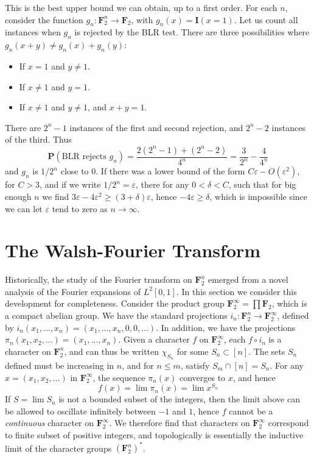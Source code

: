 This is the best upper bound we can obtain, up to a first order. For each $n$, consider the function $g_n: \mathbf{F}_2^n \to \mathbf{F}_2$, with $g_n(x) = \mathbf{I}(x = 1)$. Let us count all instances when $g_n$ is rejected by the BLR test. There are three possibilities where $g_n(x + y) \neq g_n(x) + g_n(y)$:
%
\begin{itemize}
    \item If $x = 1$ and $y \neq 1$.
    \item If $x \neq 1$ and $y = 1$.
    \item If $x \neq 1$ and $y \neq 1$, and $x + y = 1$.
\end{itemize}
%
There are $2^n - 1$ instances of the first and second rejection, and $2^n - 2$ instances of the third. Thus
%
\[ \mathbf{P}(\text{BLR rejects $g_n$}) = \frac{2(2^n - 1) + (2^n - 2)}{4^n} = \frac{3}{2^n} - \frac{4}{4^n} \]
%
and $g_n$ is $1/2^n$ close to $0$. If there was a lower bound of the form $C \varepsilon - O(\varepsilon^2)$, for $C > 3$, and if we write $1/2^n = \varepsilon$, there for any $0 < \delta < C$, such that for big enough $n$ we find $3\varepsilon - 4\varepsilon^2 \geq (3 + \delta) \varepsilon$, hence $-4\varepsilon \geq \delta$, which is impossible since we can let $\varepsilon$ tend to zero as $n \to \infty$.
 
\section{The Walsh-Fourier Transform}

Historically, the study of the Fourier transform on $\mathbf{F}_2^n$ emerged from a novel analysis of the Fourier expansions of $L^2[0,1]$. In this section we consider this development for completeness. Consider the product group $\mathbf{F}_2^\infty = \prod \mathbf{F}_2$, which is a compact abelian group. We have the standard projections $i_n: \mathbf{F}_2^n \to \mathbf{F}_2^\infty$, defined by $i_n(x_1, \dots, x_n) = (x_1, \dots, x_n, 0, 0, \dots)$. In addition, we have the projections $\pi_n(x_1, x_2, \dots) = (x_1, \dots, x_n)$. Given a character $f$ on $\mathbf{F}_2^\infty$, each $f \circ i_n$ is a character on $\mathbf{F}_2^n$, and can thus be written $\chi_{S_n}$ for some $S_n \subset [n]$. The sets $S_n$ defined must be increasing in $n$, and for $n \leq m$, satisfy $S_m \cap [n] = S_n$. For any $x = (x_1, x_2, \dots)$ in $\mathbf{F}_2^\infty$, the sequence $\pi_n(x)$ converges to $x$, and hence
%
\[ f(x) = \lim \pi_n(x) = \lim x^{S_n} \]
%
If $S = \lim S_n$ is not a bounded subset of the integers, then the limit above can be allowed to oscillate infinitely between $-1$ and $1$, hence $f$ cannot be a {\it continuous} character on $\mathbf{F}_2^\infty$. We therefore find that characters on $\mathbf{F}_2^\infty$ correspond to finite subset of positive integers, and topologically is essentially the inductive limit of the character groups $(\mathbf{F}_2^n)^*$.

